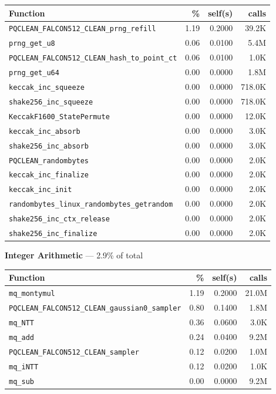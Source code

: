 \documentclass[11pt,a4paper]{article}
\begin{document}
\begin{longtable}{p{7.5cm}rrr}
\toprule
Function & \% & self(s) & calls \\
\midrule
\endhead
  \texttt{PQCLEAN\_FALCON512\_CLEAN\_prng\_refill} & 1.19 & 0.2000 & 39.2K \\
  \texttt{prng\_get\_u8} & 0.06 & 0.0100 & 5.4M \\
  \texttt{PQCLEAN\_FALCON512\_CLEAN\_hash\_to\_point\_ct} & 0.06 & 0.0100 & 1.0K \\
  \texttt{prng\_get\_u64} & 0.00 & 0.0000 & 1.8M \\
  \texttt{keccak\_inc\_squeeze} & 0.00 & 0.0000 & 718.0K \\
  \texttt{shake256\_inc\_squeeze} & 0.00 & 0.0000 & 718.0K \\
  \texttt{KeccakF1600\_StatePermute} & 0.00 & 0.0000 & 12.0K \\
  \texttt{keccak\_inc\_absorb} & 0.00 & 0.0000 & 3.0K \\
  \texttt{shake256\_inc\_absorb} & 0.00 & 0.0000 & 3.0K \\
  \texttt{PQCLEAN\_randombytes} & 0.00 & 0.0000 & 2.0K \\
  \texttt{keccak\_inc\_finalize} & 0.00 & 0.0000 & 2.0K \\
  \texttt{keccak\_inc\_init} & 0.00 & 0.0000 & 2.0K \\
  \texttt{randombytes\_linux\_randombytes\_getrandom} & 0.00 & 0.0000 & 2.0K \\
  \texttt{shake256\_inc\_ctx\_release} & 0.00 & 0.0000 & 2.0K \\
  \texttt{shake256\_inc\_finalize} & 0.00 & 0.0000 & 2.0K \\
\bottomrule
\end{longtable}

\noindent\colorbox{intcolor}{\strut \textbf{Integer Arithmetic} --- 2.9\% of total}
\vspace{2pt}

\begin{longtable}{p{7.5cm}rrr}
\toprule
Function & \% & self(s) & calls \\
\midrule
\endhead
  \texttt{mq\_montymul} & 1.19 & 0.2000 & 21.0M \\
  \texttt{PQCLEAN\_FALCON512\_CLEAN\_gaussian0\_sampler} & 0.80 & 0.1400 & 1.8M \\
  \texttt{mq\_NTT} & 0.36 & 0.0600 & 3.0K \\
  \texttt{mq\_add} & 0.24 & 0.0400 & 9.2M \\
  \texttt{PQCLEAN\_FALCON512\_CLEAN\_sampler} & 0.12 & 0.0200 & 1.0M \\
  \texttt{mq\_iNTT} & 0.12 & 0.0200 & 1.0K \\
  \texttt{mq\_sub} & 0.00 & 0.0000 & 9.2M \\
\bottomrule
\end{longtable}
\end{document}
